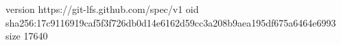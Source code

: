version https://git-lfs.github.com/spec/v1
oid sha256:17c9116919caf5f3f726db0d14e6162d59cc3a208b9aea195df675a6464e6993
size 17640
